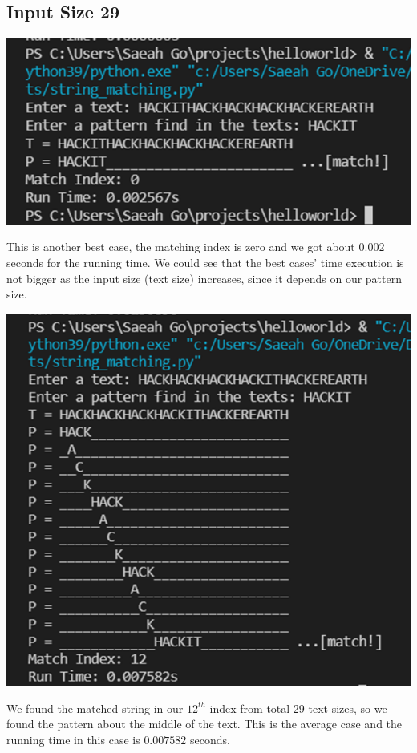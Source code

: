 \documentclass{article}
\begin{document}
\subsection{\textbf{Input Size 29}} 
\begin{center}
\includegraphics[scale = 0.7]{inputsize 29 best.png} \\
\end{center}
This is another best case, the matching index is zero and we got about $0.002$ seconds for the running time. We could see that the best cases' time execution is not bigger as the input size (text size) increases, since it depends on our pattern size. 
\begin{center}
\includegraphics[scale = 0.7]{inputsize 29 average.png} \\
\end{center}
We found the matched string in our $12^{th}$ index from total 29 text sizes, so we found the pattern about the middle of the text. This is the average case and the running time in this case is $0.007582$ seconds.
\end{document}
